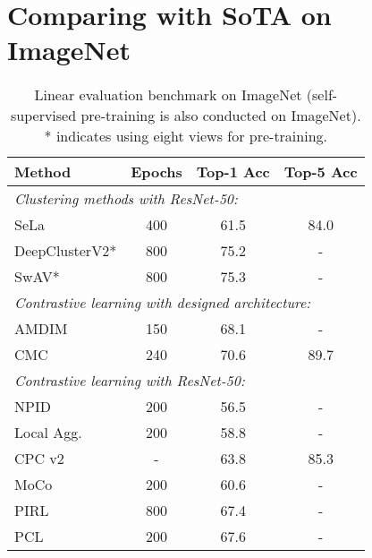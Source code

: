 \documentclass[final]{cvpr}
\begin{document}
\section{Comparing with SoTA on ImageNet}

\begin{table}[t]
\caption{Linear evaluation benchmark on ImageNet (self-supervised pre-training is also conducted on ImageNet). * indicates using eight views for pre-training.
}
\label{tab:imagenet_results_complete}
\begin{center}
\begin{small}
\begin{tabular}{lccc}
\toprule
Method & Epochs & Top-1 Acc & Top-5 Acc \\
\midrule 
\multicolumn{4}{l}{\textit{Clustering methods with ResNet-50:}}\\
SeLa \cite{Asano2020}  & \hspace{1.5ex}400  & 61.5 & 84.0\\
DeepClusterV2* \cite{caron2020unsupervised} & \hspace{1.5ex}800  & 75.2 & - \\
SwAV* \cite{caron2020unsupervised} & \hspace{1.5ex}800  & 75.3 & - \\
\midrule 
\multicolumn{4}{l}{\textit{Contrastive learning with designed architecture:}}\\
AMDIM \cite{bachman2019learning} & \hspace{1.5ex}150 & 68.1 & - \\
CMC \cite{tian2019contrastive} & \hspace{1.5ex}240  & 70.6  & 89.7\\
\multicolumn{4}{l}{\textit{Contrastive learning with ResNet-50:}}\\
NPID \cite{wu2018unsupervised} & \hspace{1.5ex}200  & 56.5  & -    \\
Local Agg. \cite{zhuang2019local} & \hspace{1.5ex}200  & 58.8  & -    \\
CPC v2~\cite{henaff2019data}      & -    & 63.8  & 85.3  \\
MoCo \cite{he2020momentum} & \hspace{1.5ex}200 & 60.6 & - \\
PIRL \cite{misra2019self}         & \hspace{1.5ex}800 & 67.4 & - \\
PCL \cite{li2020prototypical}         & \hspace{1.5ex}200 & 67.6 & - \\

\end{tabular}
\end{small}
\end{center}
\end{table}
\end{document}
